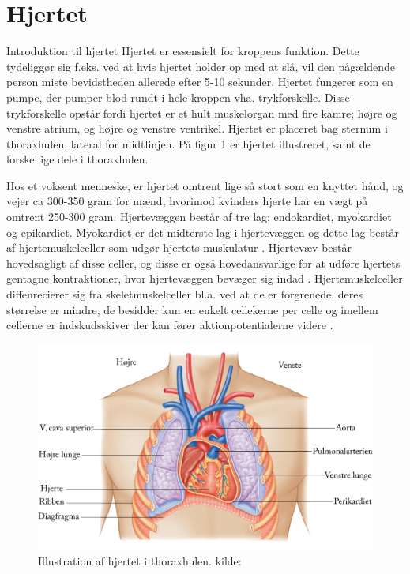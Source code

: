\section{Hjertet}
Introduktion til hjertet \label{Hjerte_ana_og_fys}
Hjertet er essensielt for kroppens funktion. Dette tydeliggør sig f.eks. ved at hvis hjertet holder op med at slå, vil den pågældende person miste bevidstheden allerede efter 5-10 sekunder. 
Hjertet fungerer som en pumpe, der pumper blod rundt i hele kroppen vha. trykforskelle. Disse trykforskelle opstår fordi hjertet er et hult muskelorgan med fire kamre; højre og venstre atrium, og højre og venstre ventrikel. Hjertet er placeret bag sternum i thoraxhulen, lateral for midtlinjen. På figur 1 er hjertet illustreret, samt de forskellige dele i thoraxhulen.

Hos et voksent menneske, er hjertet omtrent lige så stort som en knyttet hånd, og vejer ca 300-350 gram for mænd, hvorimod kvinders hjerte har en vægt på omtrent 250-300 gram. Hjertevæggen består af tre lag; endokardiet, myokardiet og epikardiet. Myokardiet er det midterste lag i hjertevæggen og dette lag består af hjertemuskelceller som udgør hjertets muskulatur \cite{gronanatomi}. Hjertevæv består hovedsagligt af disse celler, og disse er også hovedansvarlige for at udføre hjertets gentagne kontraktioner, hvor hjertevæggen bevæger sig indad \cite{cindy}. 
Hjertemuskelceller diffenrecierer sig fra skeletmuskelceller bl.a. ved at de er forgrenede, deres størrelse er mindre, de besidder kun en enkelt cellekerne per celle og imellem cellerne er indskudsskiver der kan fører aktionpotentialerne videre \cite{martini}.

\begin{figure}[H]
\includegraphics[scale=0.7]{figures/thorax}
\caption{Illustration af hjertet i thoraxhulen. kilde: \cite{cindy}}
\end{figure}

